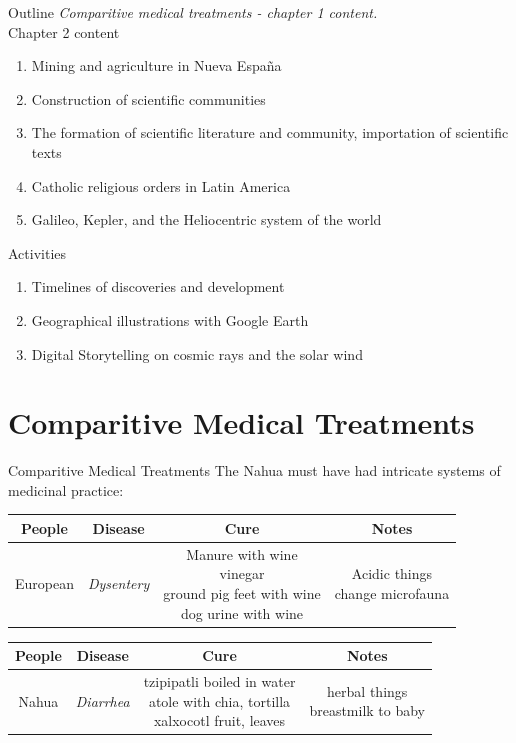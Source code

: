 \documentclass{beamer}
\begin{document}
\begin{frame}{Outline}
\textit{Comparitive medical treatments - chapter 1 content.} \\
\alert{Chapter 2 content}
\begin{enumerate}
\item Mining and agriculture in Nueva Espa\~{n}a
\item Construction of scientific communities
\item The formation of scientific literature and community, importation of scientific texts
\item Catholic religious orders in Latin America
\item Galileo, Kepler, and the Heliocentric system of the world
\end{enumerate}
\alert{Activities}
\begin{enumerate}
\item Timelines of discoveries and development
\item Geographical illustrations with Google Earth
\item Digital Storytelling on cosmic rays and the solar wind
\end{enumerate}
\end{frame}

\section{Comparitive Medical Treatments}

\begin{frame}{Comparitive Medical Treatments}
\small
The Nahua must have had intricate systems of medicinal practice:
\begin{table}
\centering
\begin{tabular}{| c | c | c | c |}
\hline
People & Disease & Cure & Notes \\ \hline \hline
European  & \textit{Dysentery} & \makecell{Manure with wine \\ vinegar \\ ground pig feet with wine \\ dog urine with wine} & \makecell{Acidic things \\ change microfauna} \\ \hline
\end{tabular}
\begin{tabular}{| c | c | c | c |}
\hline
People & Disease & Cure & Notes \\ \hline \hline
Nahua & \textit{Diarrhea} & \makecell{tzipipatli boiled in water \\ atole with chia, tortilla \\ xalxocotl fruit, leaves} & \makecell{herbal things \\ breastmilk to baby} \\ \hline
\end{tabular}
\end{table}
\end{frame}
\end{document}
